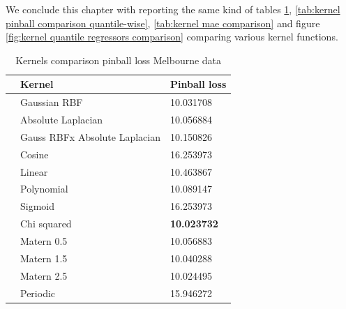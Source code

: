 We conclude this chapter with reporting the same kind of tables \ref{tab:kernel pinball comparison}, \ref{tab:kernel pinball comparison quantile-wise}, \ref{tab:kernel mae comparison} and figure \ref{fig:kernel quantile regressors comparison} comparing various kernel functions.

\begin{table}[!h]
    \caption{Kernels comparison pinball loss Melbourne data}
    \label{tab:kernel pinball comparison}
    \begin{center}
    \begin{tabular}{lll}
        \toprule
        & Kernel & Pinball loss
        \\
        \midrule
        & Gaussian RBF &  10.031708 \\
        & Absolute Laplacian &  10.056884 \\
        & Gauss RBFx Absolute Laplacian & 10.150826 \\
        & Cosine & 16.253973    \\
        & Linear & 10.463867    \\
        & Polynomial & 10.089147     \\
        & Sigmoid & 16.253973            \\
        & Chi squared & \textbf{10.023732}       \\
        & Matern 0.5 & 10.056883  \\
        & Matern 1.5 & 10.040288  \\
        & Matern 2.5 & 10.024495    \\
        & Periodic  & 15.946272\\
        \bottomrule
        \end{tabular}
    \end{center}
    \end{table}
    
